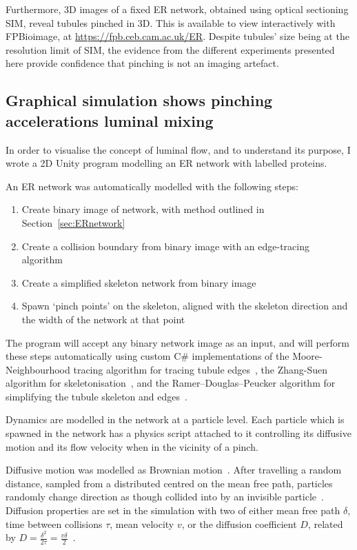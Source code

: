 Furthermore, 3D images of a fixed ER network, obtained using optical sectioning SIM, reveal tubules pinched in 3D. 
This is available to view interactively with FPBioimage, at \url{https://fpb.ceb.cam.ac.uk/ER}. 
Despite tubules' size being at the resolution limit of SIM, the evidence from the different experiments presented here provide confidence that pinching is not an imaging artefact. 

\subsection{Graphical simulation shows pinching accelerations luminal mixing}
In order to visualise the concept of luminal flow, and to understand its purpose, I wrote a 2D Unity program modelling an ER network with labelled proteins. 

An ER network was automatically modelled with the following steps:
\begin{enumerate}
	\item Create binary image of network, with method outlined in Section~\ref{sec:ERnetwork}
	\item Create a collision boundary from binary image with an edge-tracing algorithm
	\item Create a simplified skeleton network from binary image
	\item Spawn `pinch points' on the skeleton, aligned with the skeleton direction and the width of the network at that point
\end{enumerate}
The program will accept any binary network image as an input, and will perform these steps automatically using custom C\# implementations of the Moore-Neighbourhood tracing algorithm for tracing tubule edges~\cite{moore-neighbourhood}, the Zhang-Suen algorithm for skeletonisation~\cite{zhang1984fast}, and the Ramer–Douglas–Peucker algorithm for simplifying the tubule skeleton and edges~\cite{ramer1972iterative, douglas1973algorithms}. 

Dynamics are modelled in the network at a particle level. 
Each particle which is spawned in the network has a physics script attached to it controlling its diffusive motion and its flow velocity when in the vicinity of a pinch. 

Diffusive motion was modelled as Brownian motion~\cite{einstein1905molekularkinetischen}.
After travelling a random distance, sampled from a distributed centred on the mean free path, particles randomly change direction as though collided into by an invisible particle~\cite{lucretius1631}. 
Diffusion properties are set in the simulation with two of either mean free path $\delta$, time between collisions $\tau$, mean velocity $v$, or the diffusion coefficient $D$, related by $D=\frac{\delta^2}{2\tau}=\frac{v\delta}{2}$~\cite[\textit{ch. 19}]{fishbane1998physics}. 

